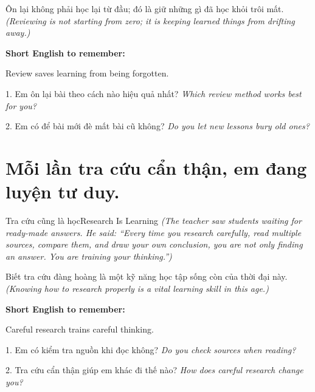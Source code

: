 \begin{baihoc}
Ôn lại không phải học lại từ đầu; đó là giữ những gì đã học khỏi trôi mất.
\textit{(Reviewing is not starting from zero; it is keeping learned things from drifting away.)}
\end{baihoc}

\begin{ghinhoanh}
\textbf{Short English to remember:}

Review saves learning from being forgotten.

\end{ghinhoanh}

\begin{tuhocnhanh}
1. Em ôn lại bài theo cách nào hiệu quả nhất? \textit{Which review method works best for you?}

2. Em có để bài mới đè mất bài cũ không? \textit{Do you let new lessons bury old ones?}
\end{tuhocnhanh}
\ngancach

\section{Mỗi lần tra cứu cẩn thận, em đang luyện tư duy.}
\begin{truyen}{Tra cứu cũng là học}{Research Is Learning}
\textit{(The teacher saw students waiting for ready-made answers. He said: ``Every time you research carefully, read multiple sources, compare them, and draw your own conclusion, you are not only finding an answer. You are training your thinking.'')}
\end{truyen}

\begin{baihoc}
Biết tra cứu đàng hoàng là một kỹ năng học tập sống còn của thời đại này.
\textit{(Knowing how to research properly is a vital learning skill in this age.)}
\end{baihoc}

\begin{ghinhoanh}
\textbf{Short English to remember:}

Careful research trains careful thinking.

\end{ghinhoanh}

\begin{tuhocnhanh}
1. Em có kiểm tra nguồn khi đọc không? \textit{Do you check sources when reading?}

2. Tra cứu cẩn thận giúp em khác đi thế nào? \textit{How does careful research change you?}
\end{tuhocnhanh}
\ngancach

